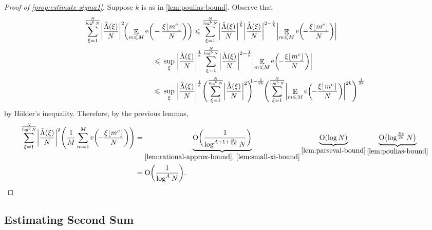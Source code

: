 \documentclass[letterpaper, 12pt]{article}
\theoremstyle{plain}
\theoremstyle{definition}
\theoremstyle{plain}
\theoremstyle{plain}
\numberwithin{equation}{section}
\newcommand{\Oh}{{\rm O}}
\renewcommand{\leq}{\leqslant}
\newcommand{\E}{\mathbb{E}}
\newcommand{\1}{\textbf{1}}
\DeclarePairedDelimiter\floor{\lfloor}{\rfloor}
\DeclareMathOperator{\e}{e}
\begin{document}
\begin{proof}[Proof of \cref{prop:estimate-sigma1}]
    Suppose $k$ is as in \cref{lem:poulias-bound}. Observe that
    \begin{align*}
        \sum_{\xi = 1}^{\frac{N}{\log^b N}} \biggl\lvert \frac{\hat{\Lambda}(\xi)}{N} \biggr\rvert^2 
        \!\biggl(\mathop{\E}_{m \leq M} \e\biggl(\! &-\frac{\xi \floor{m^c}}{N} \biggr)\biggr)
        \leq \sum_{\xi = 1}^{\frac{N}{\log^b N}} \biggl\lvert \frac{\hat{\Lambda}(\xi)}{N} \biggr\rvert^{\frac{1}{k}} \biggl\lvert \frac{\hat{\Lambda}(\xi)}{N} \biggr\rvert^{2 - \frac{1}{k}} \biggl\lvert \mathop{\E}_{m \leq M} \e\biggl(\! -\frac{\xi \floor{m^c}}{N} \biggr)\biggr\rvert\\
        &\leq\: \sup_{\xi}\; \biggl\lvert \frac{\hat{\Lambda}(\xi)}{N} \biggr\rvert^{\frac{1}{k}}\sum_{\xi = 1}^{\frac{N}{\log^b N}} \biggl\lvert \frac{\hat{\Lambda}(\xi)}{N} \biggr\rvert^{2 - \frac{1}{k}} \biggl\lvert \mathop{\E}_{m \leq M} \e\biggl(\! -\frac{\xi \floor{m^c}}{N} \biggr)\biggr\rvert\\
        &\leq\: \sup_{\xi}\; \biggl\lvert \frac{\hat{\Lambda}(\xi)}{N} \biggr\rvert^{\frac{1}{k}} \Biggl(\sum_{\xi = 1}^{\frac{N}{\log^b N}} \biggl\lvert \frac{\hat{\Lambda}(\xi)}{N} \biggr\rvert ^2 \Biggr)^{\!\!\! 1 - \frac{1}{2k}}
        \! \Biggl(\sum_{\xi = 1}^{\frac{N}{\log^b N}} \biggl\lvert \mathop{\E}_{m \leq M} \e\biggl(\! -\frac{\xi \floor{m^c}}{N} \biggr)\biggr\rvert^{2k} \Biggr)^{\frac{1}{2k}}
    \end{align*}
    by H\"{o}lder's inequality. Therefore, by the previous lemmas,
    \begin{align*}
        \sum_{\xi = 1}^{\frac{N}{\log^b N}} \biggl\lvert \frac{\hat{\Lambda}(\xi)}{N} \biggr\rvert^2 \Biggl(\frac{1}{M} \sum_{m = 1}^M \e\biggl(\! -\frac{\xi \floor{m^c}}{N} \biggr)\Biggr)
        &= \underbrace{\Oh\biggl(\frac{1}{\log^{A + 1 + \frac{Bc}{2k}} N} \biggr)}_{\cref{lem:rational-approx-bound},\ \cref{lem:small-xi-bound}} \underbrace{\Oh(\log N)}_{\cref{lem:parseval-bound}} \underbrace{\Oh\bigl(\log^{\frac{Bc}{2k}} N \bigr)}_{\cref{lem:poulias-bound}}\\
        &= \Oh\biggl(\frac{1}{\log^A N}\biggr).
    \end{align*}
\end{proof}

\subsection{Estimating Second Sum}
\end{document}
